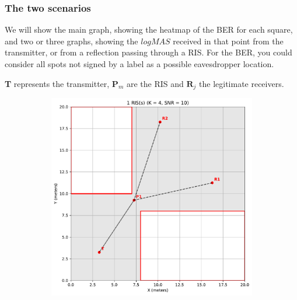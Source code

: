 \begin{itemize}
\end{itemize}

\newpage
\subsubsection{The two scenarios}

We will show the main graph, showing the heatmap of the BER for each square, and two or three graphs, showing the $logMAS$ received in that point from the transmitter, or from a reflection passing through a RIS. For the BER, you could consider all spots not signed by a label as a possible eavesdropper location.

\textbf{T} represents the transmitter, $\bm{P}_m$ are the RIS and $\bm{R}_j$ the legitimate receivers.

\begin{figure}[H]
  \centering
  \begin{subfigure}[b]{0.48\textwidth}
    \centering
    \includegraphics[width=\textwidth]{imgs/heatmap-simulations/1 RIS(s) (K = 4, SNR = 10).pdf}
    \label{fig:first_scenario}
  \end{subfigure}
  \hfill
  \begin{subfigure}[b]{0.48\textwidth}
    \centering

\end{subfigure}
\end{figure}
